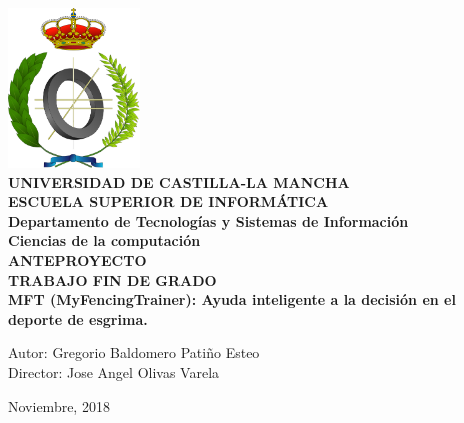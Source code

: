 \documentclass[11pt,a4paper,twoside,final]{article}
\begin{document}


\begin{titlepage}
	\begin{center}
	\includegraphics[width=3.5cm]{escudoInf}\\[1.5cm]

	{\LARGE \textbf{UNIVERSIDAD DE CASTILLA-LA MANCHA \\[0.5em]
	ESCUELA SUPERIOR DE INFORMÁTICA}}\\[0.5cm]
	{\Large \textbf{Departamento de Tecnologías y Sistemas de Información}}\\[0.5cm]
	{\large \textbf{Ciencias de la computación}}\\[1.5cm]
	{\LARGE \textbf{ANTEPROYECTO \\[0.5em]
	TRABAJO FIN DE GRADO}}\\[1cm]

	{\LARGE \textbf{MFT (MyFencingTrainer): Ayuda inteligente a la decisión en el deporte de esgrima.}}\\[3cm]
	\end{center}

	\begin{flushleft}
		{\Large Autor: Gregorio Baldomero Patiño Esteo} \\[1em]
		{\Large Director: Jose Angel Olivas Varela} \\[1em]
	\end{flushleft}
	\vfill%

	\begin{flushright}
		{\Large Noviembre, 2018}
	\end{flushright}
\end{titlepage}


\tableofcontents  %

\renewcommand{\tablename}{Tabla} %

\newpage
\end{document}

